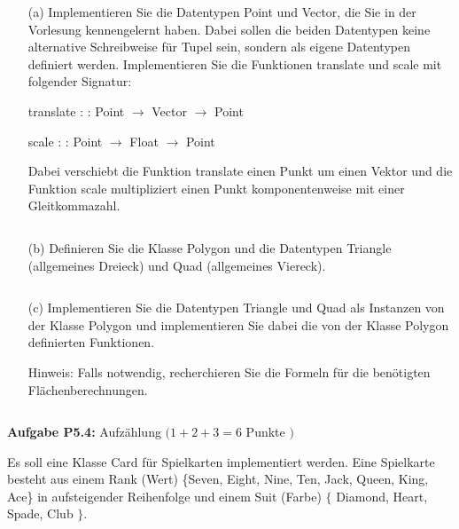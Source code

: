 \begin{itemize}
  \item [(a)] Implementieren Sie die Datentypen Point und Vector, die Sie in der Vorlesung kennengelernt haben. Dabei sollen die beiden Datentypen keine alternative Schreibweise für Tupel sein, sondern als eigene Datentypen definiert werden. Implementieren Sie die Funktionen translate und scale mit folgender Signatur:

  translate : : Point $\rightarrow$ Vector $\rightarrow$ Point
  
  scale : : Point $\rightarrow$ Float $\rightarrow$ Point
  
  Dabei verschiebt die Funktion translate einen Punkt um einen Vektor und die Funktion scale multipliziert einen Punkt komponentenweise mit einer Gleitkommazahl.

\inputminted{Haskell}{A5_3a.hs}

\newpage

  \item [(b)] Definieren Sie die Klasse Polygon und die Datentypen Triangle (allgemeines Dreieck) und Quad (allgemeines Viereck).

\inputminted{Haskell}{A5_3b.hs}

\newpage

\item [(c)] Implementieren Sie die Datentypen Triangle und Quad als Instanzen von der Klasse Polygon und implementieren Sie dabei die von der Klasse Polygon definierten Funktionen.

Hinweis: Falls notwendig, recherchieren Sie die Formeln für die benötigten Flächenberechnungen.

\inputminted{Haskell}{A5_3c.hs}
\end{itemize}

\newpage

\textbf{Aufgabe P5.4:} Aufzählung $(1+2+3=6$ Punkte $)$

Es soll eine Klasse Card für Spielkarten implementiert werden. Eine Spielkarte besteht aus einem Rank (Wert) \{Seven, Eight, Nine, Ten, Jack, Queen, King, Ace\} in aufsteigender Reihenfolge und einem Suit (Farbe) $\{$ Diamond, Heart, Spade, Club $\}$.


